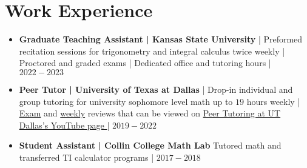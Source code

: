 \documentclass{article}
\begin{document}
\section{Work Experience}
\begin{itemize}
\item \textbf{Graduate Teaching Assistant | Kansas State University} | Preformed recitation sessions for trigonometry and integral calculus twice weekly | Proctored and graded exams | Dedicated office and tutoring hours | $2022-2023$
\item \textbf{Peer Tutor | University of Texas at Dallas} | 
Drop-in individual and group tutoring for university sophomore level math up to $19$ hours weekly | \href{https://www.youtube.com/watch?v=YkmCptIYk7M&list=PL6quCz-uL8Xb8mJLMbqXnxLUceSGzrkcK&index=2}{Exam}
and
\href{https://www.youtube.com/watch?v=0Zqv29HgjxI&list=PL6quCz-uL8XYAlXcC4wVMJ7dSkIo3_Ysh}{ weekly} reviews
that can be viewed on \href{https://www.youtube.com/@PeerTutoringatUTDallas}{Peer Tutoring at UT Dallas's YouTube page }| $2019-2022$
\item \textbf{Student Assistant | Collin College Math Lab} Tutored math and transferred TI calculator programs | $2017-2018$ \medskip
\end{itemize}
\end{document}
